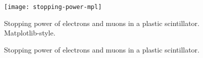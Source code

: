 \documentclass{article}
\begin{document}
\begin{figure}
\centering
\texttt{[image: stopping-power-mpl]}
\caption{Stopping power of electrons and muons in a plastic scintillator.
Matplotlib-style.}
\end{figure}

\begin{figure}
\centering

\caption{Stopping power of electrons and muons in a plastic scintillator.}
\end{figure}
\end{document}

